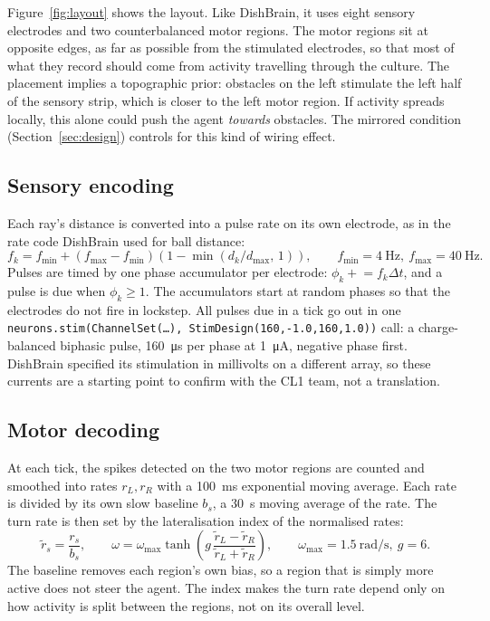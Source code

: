 \documentclass[11pt,a4paper]{article}
\newcommand{\code}[1]{\texttt{#1}}
\begin{document}
Figure~\ref{fig:layout} shows the layout. Like DishBrain, it uses eight sensory electrodes and
two counterbalanced motor regions. The motor regions sit at opposite edges, as far as possible
from the stimulated electrodes, so that most of what they record should come from activity
travelling through the culture. The placement implies a topographic prior: obstacles on the
left stimulate the left half of the sensory strip, which is closer to the left motor region. If
activity spreads locally, this alone could push the agent \emph{towards} obstacles. The mirrored
condition (Section~\ref{sec:design}) controls for this kind of wiring effect.

\subsection{Sensory encoding}

Each ray's distance is converted into a pulse rate on its own electrode, as in the rate code
DishBrain used for ball distance:
\begin{equation}
  f_k = f_{\min} + (f_{\max}-f_{\min})\left(1-\min\!\left(d_k/d_{\max},\,1\right)\right),\qquad
  f_{\min}=\SI{4}{\hertz},\ f_{\max}=\SI{40}{\hertz}.
\end{equation}
Pulses are timed by one phase accumulator per electrode: $\phi_k\mathrel{+}=f_k\Delta t$, and a
pulse is due when $\phi_k\geq1$. The accumulators start at random phases so that the electrodes
do not fire in lockstep. All pulses due in a tick go out in one \code{neurons.stim(ChannelSet(\dots),
StimDesign(160,-1.0,160,1.0))} call: a charge-balanced biphasic pulse,
\SI{160}{\micro\second} per phase at \SI{1}{\micro\ampere}, negative phase first. DishBrain
specified its stimulation in millivolts on a different array, so these currents are a starting
point to confirm with the CL1 team, not a translation.

\subsection{Motor decoding}

At each tick, the spikes detected on the two motor regions are counted and smoothed into rates
$r_L, r_R$ with a \SI{100}{\milli\second} exponential moving average. Each rate is divided by its
own slow baseline $b_s$, a \SI{30}{\second} moving average of the rate. The turn rate is then set
by the lateralisation index of the normalised rates:
\begin{equation}
  \tilde r_s = \frac{r_s}{b_s},\qquad
  \omega = \omega_{\max}\tanh\!\left(g\,\frac{\tilde r_L-\tilde r_R}{\tilde r_L+\tilde r_R}\right),\qquad
  \omega_{\max}=\SI{1.5}{\radian\per\second},\ g=6.
\end{equation}
The baseline removes each region's own bias, so a region that is simply more active does not
steer the agent. The index makes the turn rate depend only on how activity is split between
the regions, not on its overall level.
\end{document}
